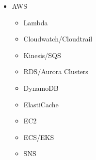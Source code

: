 \documentclass{resume}
\begin{document}
\begin{minipage}[t]{0.3\textwidth}
  \begin{itemize}
    \item AWS
    \begin{itemize}
      \item Lambda
      \item Cloudwatch/Cloudtrail
      \item Kinesis/SQS
      \item RDS/Aurora Clusters
      \item DynamoDB
      \item ElastiCache
      \item EC2
      \item ECS/EKS
      \item SNS
    \end{itemize}
  \end{itemize}
\end{minipage}
\end{document}
